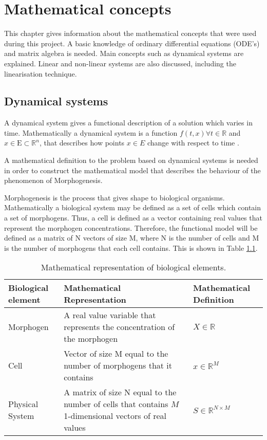 \chapter{Mathematical concepts}
This chapter gives information about the mathematical concepts that were used during this project. A basic knowledge of ordinary differential equations (ODE's) and matrix algebra is needed. Main concepts such as dynamical systems are explained.  Linear and non-linear systems are also discussed, including the linearisation technique.  
\section{Dynamical systems}
\label{dynsys}

A dynamical system gives a functional description of a solution which varies in time. 
Mathematically a dynamical system is a function $ f(t,x) \forall  t \in \mathbb{R} $ and $ x \in \mathrm{E} \subset \mathbb{R}^n $, that describes how points $ x \in E $ change with respect to time \cite[p.~182]{perko_differential_2001}.

A mathematical definition to the problem based on dynamical systems is needed in order to construct the mathematical model that describes the behaviour of the phenomenon of Morphogenesis. 
    
Morphogenesis is the process that gives shape to biological organisms. Mathematically a biological system may be defined as a set of cells which contain a set of morphogens. Thus, a cell is defined as a vector containing real values that represent the morphogen concentrations. Therefore, the functional model will be defined as a matrix of N vectors of size M, where N is the number of cells and M is the number of morphogens that each cell contains. This is shown in Table \ref{mathbiol}.

    \begin{table}[h!]
        \begin{center}
    \caption{Mathematical representation of biological elements.}
        \begin{tabular}{| l | p{6cm} | p{3cm} |}
        \hline
        Biological element & Mathematical Representation & Mathematical Definition \\ \hline
        Morphogen & A real value variable that represents 
the concentration of the morphogen & $ X \in \mathbb{R} $ \\ \hline      
        Cell & Vector of size M equal to the number of morphogens that it contains & $ x \in \mathbb{R}^{M} $ \\ \hline 
        Physical System & A matrix of size N equal to the number of cells
that contains $ \mathit{M} $ 1-dimensional vectors of real values & $ S \in \mathbb{R}^{N \times M} $ \\ \hline
        \end{tabular}
    \end{center}

    \label{mathbiol}
    \end{table}
	
